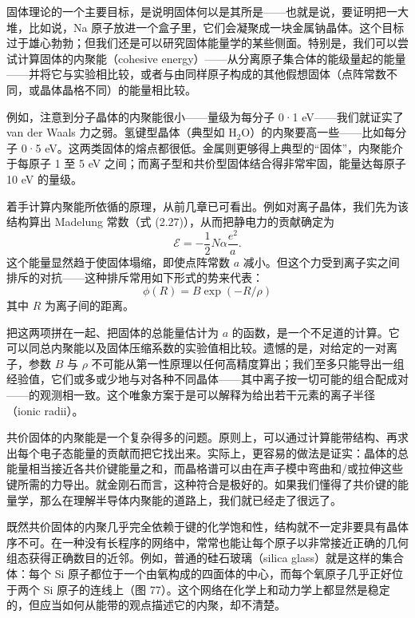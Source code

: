 固体理论的一个主要目标，是说明固体何以是其所是——也就是说，要证明把一大堆，比如说，Na 原子放进一个盒子里，它们会凝聚成一块金属钠晶体。这个目标过于雄心勃勃；但我们还是可以研究固体能量学的某些侧面。特别是，我们可以尝试计算固体的内聚能（cohesive energy）——从分离原子集合体的能级量起的能量——并将它与实验相比较，或者与由同样原子构成的其他假想固体（点阵常数不同，或晶体晶格不同）的能量相比较。

例如，注意到分子晶体的内聚能很小——量级为每分子 0·1 eV——我们就证实了 van der Waals 力之弱。氢键型晶体（典型如 H$_2$O）的内聚要高一些——比如每分子 0·5 eV。这两类固体的熔点都很低。金属则更够得上典型的“固体”，内聚能介于每原子 1 至 5 eV 之间；而离子型和共价型固体结合得非常牢固，能量达每原子 10 eV 的量级。

着手计算内聚能所依循的原理，从前几章已可看出。例如对离子晶体，我们先为该结构算出 Madelung 常数（式 (2.27)），从而把静电力的贡献确定为
\begin{equation*}
\mathcal{E}=-\frac{1}{2}N\alpha\frac{e^{2}}{a}.
\tag{4.1}
\end{equation*}
这个能量显然趋于使固体塌缩，即使点阵常数 $a$ 减小。但这个力受到离子实之间排斥的对抗——这种排斥常用如下形式的势来代表：
\begin{equation*}
\phi(R)=B\exp(-R/\rho)
\tag{4.2}
\end{equation*}
其中 $R$ 为离子间的距离。

把这两项拼在一起、把固体的总能量估计为 $a$ 的函数，是一个不足道的计算。它可以同总内聚能以及固体压缩系数的实验值相比较。遗憾的是，对给定的一对离子，参数 $B$ 与 $\rho$ 不可能从第一性原理以任何高精度算出；我们至多只能导出一组经验值，它们或多或少地与对各种不同晶体——其中离子按一切可能的组合配成对——的观测相一致。这个唯象方案于是可以解释为给出若干元素的离子半径（ionic radii）。

共价固体的内聚能是一个复杂得多的问题。原则上，可以通过计算能带结构、再求出每个电子态能量的贡献而把它找出来。实际上，更容易的做法是证实：晶体的总能量相当接近各共价键能量之和，而晶格谱可以由在声子模中弯曲和/或拉伸这些键所需的力导出。就金刚石而言，这种符合是极好的。如果我们懂得了共价键的能量学，那么在理解半导体内聚能的道路上，我们就已经走了很远了。

既然共价固体的内聚几乎完全依赖于键的化学饱和性，结构就不一定非要具有晶体序不可。在一种没有长程序的网络中，常常也能让每个原子以非常接近正确的几何组态获得正确数目的近邻。例如，普通的硅石玻璃（silica glass）就是这样的集合体：每个 Si 原子都位于一个由氧构成的四面体的中心，而每个氧原子几乎正好位于两个 Si 原子的连线上（图 77）。这个网络在化学上和动力学上都显然是稳定的，但应当如何从能带的观点描述它的内聚，却不清楚。

